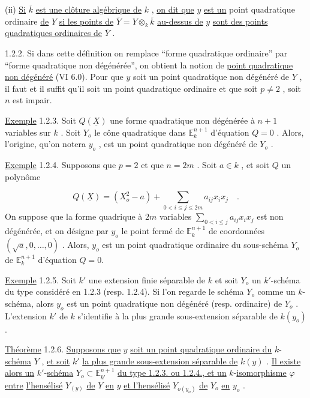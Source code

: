 (ii) \underline{Si} $\overline{k}$ \underline{est une clôture algébrique de} $k$ , \underline{on dit que} $y$ \underline{est un} point quadratique ordinaire \underline{de} $Y$ \underline{si les points de} $\overline{Y} = Y \otimes_k \overline{k}$ \underline{au-dessus de} $y$ \underline{sont des points quadratiques ordinaires de} $\overline{Y}$ .

1.2.2. Si dans cette définition on remplace ``forme quadratique ordinaire'' par ``forme quadratique non dégénérée'', on obtient la notion de \underline{point quadratique non dégénéré} (VI 6.0). Pour que $y$ soit un point quadratique non dégénéré de $Y$ , il faut et il suffit qu'il soit un point quadratique ordinaire et que soit $p \neq 2$ ,
soit $n$ est impair.

\underline{Exemple} 1.2.3. Soit $Q(\underline{X})$ une forme quadratique non dégénérée à $n+1$ variables sur $k$ . Soit $Y_o$ le cône quadratique dans $\mathbb{E}^{n+1}_k$ d'équation $Q = 0$ . Alors, l'origine, qu'on notera $y_o$ , est un point quadratique non dégénéré de $Y_o$ .

\underline{Exemple} 1.2.4. Supposons que $p = 2$ et que $n = 2m$ . Soit $a \in k$ , et soit $Q$ un polynôme

\begin{equation*}
Q(\underline{X}) = (X_o^2 - a) + \sum_{0<i\leq j\leq 2m} a_{ij}x_ix_j \quad .
\end{equation*}
On suppose que la forme quadrique à $2m$ variables $\sum_{0<i\leq j} a_{ij}x_ix_j$ est non dégénérée, et on désigne par $y_o$ le point fermé de $\mathbb{E}^{n+1}_k$ de coordonnées $(\sqrt{a},0,\ldots,0)$ . Alors, $y_o$ est un point quadratique ordinaire du sous-schéma $Y_o$ de $\mathbb{E}^{n+1}_k$ d'équation $Q = 0$.

\underline{Exemple} 1.2.5. Soit $k'$ une extension finie séparable de $k$ et soit $Y_o$ un $k'$-schéma du type considéré en 1.2.3 (resp. 1.2.4). Si l'on regarde le schéma $Y_o$ comme un $k$-schéma, alors $y_o$ est un point quadratique non dégénéré (resp. ordinaire) de $Y_o$ . L'extension $k'$ de $k$ s'identifie à la plus grande sous-extension séparable de $k(y_o)$ .

\underline{Théorème} 1.2.6. \underline{Supposons que} $y$ \underline{soit un point quadratique ordinaire du} $k$-\underline{schéma} $Y$ , \underline{et soit} $k'$ \underline{la plus grande sous-extension séparable de} $k(y)$ . \underline{Il existe alors un} $k'$-\underline{schéma} $Y_o \subset \mathbb{E}^{n+1}_{k'}$ \underline{du type 1.2.3. ou 1.2.4., et un} $k$-\underline{isomorphisme} $\varphi$ \underline{entre} \underline{l'hensélisé} $Y_{(y)}$ \underline{de} $Y$ \underline{en} $y$ \underline{et l'hensélisé} $Y_{o(y_o)}$ \underline{de} $Y_o$ \underline{en} $y_o$ .

